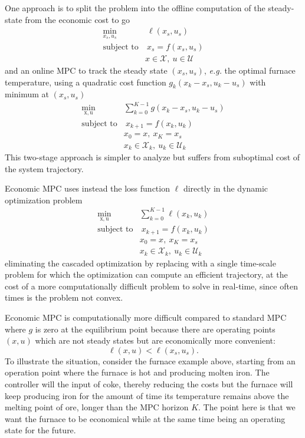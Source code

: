 \documentclass[11pt]{report}
\newcommand{\bs}[1]{\boldsymbol{#1}}
\newcommand{\bsu}{\bs{\mathrm{u}}}
\newcommand{\bsx}{\bs{\mathrm{x}}}
\begin{document}
One approach is to split the problem into the offline computation of the steady-state from the economic cost to go
\begin{align*}
  \min_{x_s,u_s} &\ \ell(x_s,u_s) \\
  \text{subject to} &\ x_s = f(x_s,u_s) \\
                 & x\in \mathcal{X},\ u\in \mathcal{U}
\end{align*}
and an online MPC to track the steady state $(x_s,u_s)$, \textit{e.g.} the optimal furnace temperature, using a quadratic cost function $g_k(x_k-x_s,u_k-u_s)$ with minimum at $(x_s,u_s)$
\begin{align*}
  \min_{\bsx,\bsu} & \sum_{k=0}^{K-1} g(x_k-x_s,u_k-u_s) \\
  \text{subject to} &\ x_{k+1} = f(x_k,u_k) \\
                   & x_0 = x,\ x_K=x_s \\
                   & x_k\in \mathcal{X}_k,\ u_k\in \mathcal{U}_k
\end{align*}
This two-stage approach is simpler to analyze but suffers from suboptimal cost of the system trajectory.

Economic MPC uses instead the loss function $\ell$ directly in the dynamic optimization problem
\begin{align*}
  \min_{\bsx,\bsu} & \sum_{k=0}^{K-1} \ell(x_k,u_k) \\
  \text{subject to} &\ x_{k+1} = f(x_k,u_k) \\
                   & x_0 = x,\ x_K=x_s \\
                   & x_k\in \mathcal{X}_k,\ u_k\in \mathcal{U}_k
\end{align*}
eliminating the cascaded optimization by replacing with a single time-scale problem for which the optimization can compute an efficient trajectory, at the cost of a more computationally difficult problem to solve in real-time, since often times is the problem not convex.

Economic MPC is computationally more difficult compared to standard MPC where $g$ is zero at the equilibrium point because there are operating points $(x,u)$ which are not steady states but are economically more convenient:
\begin{equation*}
  \ell(x,u) < \ell(x_s,u_s).
\end{equation*}
To illustrate the situation, consider the furnace example above, starting from an operation point where the furnace is hot and producing molten iron. The controller will the input of coke, thereby reducing the costs but the furnace will keep producing iron for the amount of time its temperature remains above the melting point of ore, longer than the MPC horizon $K$. The point here is that we want the furnace to be economical while at the same time being an operating state for the future.
\end{document}
